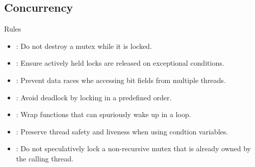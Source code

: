 \subsection{Concurrency}

\begin{frame}[t]{Rules}
\begin{itemize}
  \item {}: 
        Do not destroy a mutex while it is locked.
  \vfill
  \item {}: 
        Ensure actively held locks are released on exceptional conditions.
  \vfill
  \item {}: 
        Prevent data races whe accessing bit fields from multiple threads.
  \vfill
  \item {}: 
        Avoid deadlock by locking in a predefined order.
  \vfill
  \item {}: 
        Wrap functions that can spuriously wake up in a loop.
  \vfill
  \item {}: 
        Preserve thread safety and liveness when using condtion variables.
  \vfill
  \item {}: 
        Do not speculatively lock a non-recursive mutex that is already owned by the calling thread.
\end{itemize}
\end{frame}
